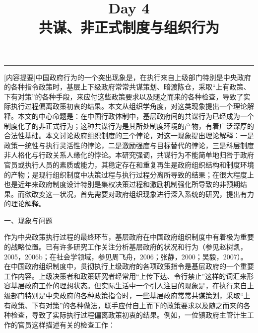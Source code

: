 \documentclass[12pt,a4paper]{article}
\title{\bfseries Day 4\\[0.3em]共谋、非正式制度与组织行为}
\author{}
\date{}
\begin{document}
\maketitle

\vspace{-2em}

\vspace{1em}


\vspace{0.5em}
\vspace{0.3em}

\noindent\rule{\textwidth}{0.4pt}

\vspace{0.3em}



[内容提要]中国政府行为的一个突出现象是，在执行来自上级部门特别是中央政府的各种指令政策时，基层上下级政府常常共谋策划、暗渡陈仓，采取“上有政策、下有对策”的各种手段，来应付这些政策要求以及随之而来的各种检查，导致了实际执行过程偏离政策初衷的结果。本文从组织学角度，对这类现象提出一个理论解释。本文的中心命题是：在中国行政体制中，基层政府间的共谋行为已经成为一个制度化了的非正式行为；这种共谋行为是其所处制度环境的产物，有着广泛深厚的合法性基础。本文讨论政府组织制度的三个悖论，对这一现象提出理论解释：一是政策一统性与执行灵活性的悖论，二是激励强度与目标替代的悖论，三是科层制度非人格化与行政关系人缘化的悖论。本研究强调，共谋行为不能简单地归咎于政府官员或执行人员的素质或能力，其稳定存在和重复再生是政府组织结构和制度环境的产物；是现行组织制度中决策过程与执行过程分离所导致的结果；在很大程度上也是近年来政府制度设计特别是集权决策过程和激励机制强化所导致的非预期结果。而欲改变这一状况，首先需要对政府组织现象进行深入系统的研究，提出有力的理论解释。



一、现象与问题



作为中央政策执行过程的最终环节，基层政府在中国政府组织制度中有着极为重要的战略位置。已有许多研究工作关注分析基层政府的状况和行为（参见赵树凯，2005，2006b；在社会学领域，参见周飞舟，2006；张静，2000；吴毅，2007）。在中国政府组织制度中，贯彻执行上级政府的各项政策指令是基层政府的一个重要工作内容。上级决策者和政策研究者经常用“上传下达、令行禁止”这样的词汇来形容基层政府工作的理想状态。但实际生活中一个引人注目的现象是，在执行来自上级部门特别是中央政府的各种政策指令时，一些基层政府常常共谋策划，采取“上有政策、下有对策”的各种做法，联手应付自上而下的政策要求以及随之而来的各种检查，导致了实际执行过程偏离政策初衷的结果。例如，一位镇政府主管计生工作的官员这样描述有关的检查工作：
\end{document}
